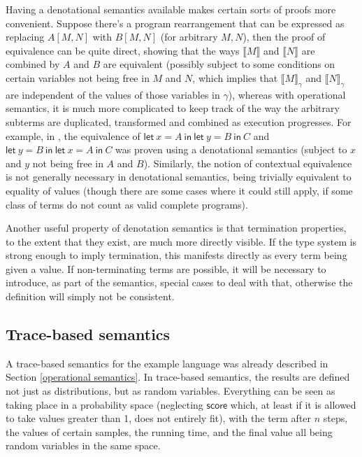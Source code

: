 \documentclass[titlepage]{article}
\newcommand{\tscore}{\mathsf{score}}
\newcommand{\denotation}[1]{\llbracket #1 \rrbracket}
\begin{document}
Having a denotational semantics available makes certain sorts of proofs more convenient. Suppose there's a program rearrangement that can be expressed as replacing $A[M,N]$ with $B[M,N]$ (for arbitrary $M, N$), then the proof of equivalence can be quite direct, showing that the ways $\denotation M$ and $\denotation N$ are combined by $A$ and $B$ are equivalent (possibly subject to some conditions on certain variables not being free in $M$ and $N$, which implies that $\denotation M_\gamma$ and $\denotation N_\gamma$ are independent of the values of those variables in $\gamma$), whereas with operational semantics, it is much more complicated to keep track of the way the arbitrary subterms are duplicated, transformed and combined as execution progresses. For example, in \cite{staton2017commutative}, the equivalence of $\mathsf{let}\ x = A\ \mathsf{in\ let}\ y = B\ \mathsf{in}\ C$ and $\mathsf{let}\ y=B\ \mathsf{in\ let}\ x=A\ \mathsf{in}\ C$ was proven using a denotational semantics (subject to $x$ and $y$ not being free in $A$ and $B$). Similarly, the notion of contextual equivalence is not generally necessary in denotational semantics, being trivially equivalent to equality of values (though there are some cases where it could still apply, if some class of terms do not count as valid complete programs).

Another useful property of denotation semantics is that termination properties, to the extent that they exist, are much more directly visible. If the type system is strong enough to imply termination, this manifests directly as every term being given a value. If non-terminating terms are possible, it will be necessary to introduce, as part of the semantics, special cases to deal with that,\cite[\S 5.2]{MOSSES1990575} otherwise the definition will simply not be consistent.

\subsection{Trace-based semantics}
A trace-based semantics for the example language was already described in Section \ref{operational semantics}. In trace-based semantics, the results are defined not just as distributions, but as random variables. Everything can be seen as taking place in a probability space (neglecting $\tscore$ which, at least if it is allowed to take values greater than 1, does not entirely fit), with the term after $n$ steps, the values of certain samples, the running time, and the final value all being random variables in the same space.
\end{document}

